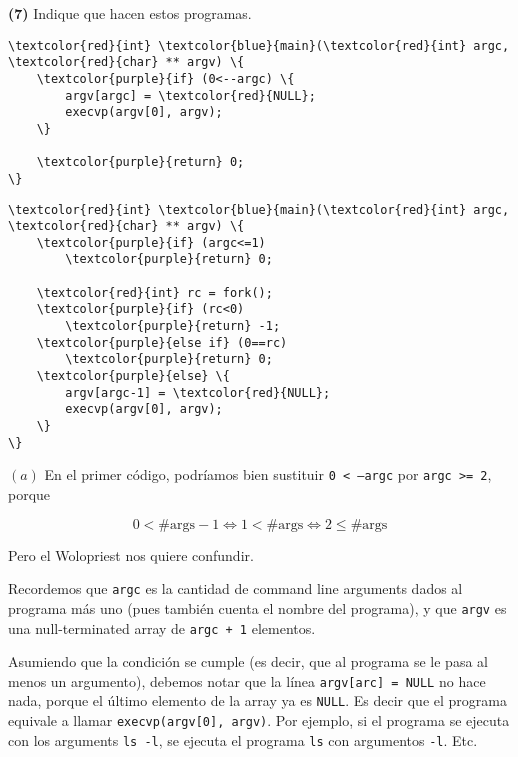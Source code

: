 \documentclass[12pt]{article}
\theoremstyle{definition}
\begin{document}
\begin{shaded}
    \textbf{(7)} Indique que hacen estos programas.

\bigskip

\noindent
\begin{minipage}[t]{0.48\textwidth}
\begin{Verbatim}[commandchars=\\\{\}]
\textcolor{red}{int} \textcolor{blue}{main}(\textcolor{red}{int} argc, \textcolor{red}{char} ** argv) \{
    \textcolor{purple}{if} (0<--argc) \{
        argv[argc] = \textcolor{red}{NULL};
        execvp(argv[0], argv);
    \}

    \textcolor{purple}{return} 0;
\}
\end{Verbatim}
\end{minipage}
\hfill
\begin{minipage}[t]{0.48\textwidth}
\begin{Verbatim}[commandchars=\\\{\}]
\textcolor{red}{int} \textcolor{blue}{main}(\textcolor{red}{int} argc, \textcolor{red}{char} ** argv) \{
    \textcolor{purple}{if} (argc<=1)
        \textcolor{purple}{return} 0;

    \textcolor{red}{int} rc = fork();
    \textcolor{purple}{if} (rc<0)
        \textcolor{purple}{return} -1;
    \textcolor{purple}{else if} (0==rc)
        \textcolor{purple}{return} 0;
    \textcolor{purple}{else} \{
        argv[argc-1] = \textcolor{red}{NULL};
        execvp(argv[0], argv);
    \}
\}
\end{Verbatim}
\end{minipage}
\end{shaded}

$(a)$ En el primer código, podríamos bien sustituir \texttt{0 < --argc} por 
\texttt{argc >= 2}, porque 

\begin{equation*}
    0 < \#\text{args} - 1 \iff 1 < \#\text{args} \iff 2 \leq \#\text{args}
\end{equation*}

Pero el Wolopriest nos quiere confundir. 

Recordemos que \texttt{argc} es la cantidad de command line arguments dados al
programa más uno (pues también cuenta el nombre del programa), y que
\texttt{argv} es una null-terminated array de \texttt{argc + 1} elementos.

Asumiendo que la condición se cumple (es decir, que al programa se le pasa al
menos un argumento), debemos notar que la línea \texttt{argv[arc] = NULL} no
hace nada, porque el último elemento de la array ya es \texttt{NULL}. Es decir
que el programa equivale a llamar \texttt{execvp(argv[0], argv)}. Por ejemplo,
si el programa se ejecuta con los arguments \texttt{ls -l}, se ejecuta el
programa \texttt{ls} con argumentos \texttt{-l}. Etc.
\end{document}
